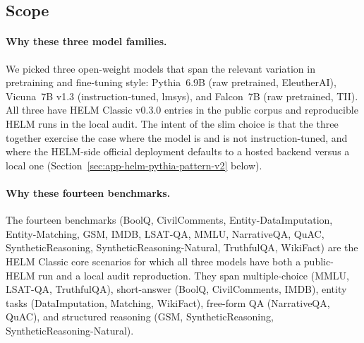 \subsection{Scope}
\label{sec:app-helm-scope-v2}

\paragraph{Why these three model families.}
We picked three open-weight models that span the relevant variation in
  pretraining and fine-tuning style: Pythia~6.9B (raw pretrained,
  EleutherAI), Vicuna~7B v1.3 (instruction-tuned, lmsys), and
  Falcon~7B (raw pretrained, TII).
All three have HELM Classic v0.3.0 entries in the public corpus and
  reproducible HELM runs in the local audit.
The intent of the slim choice is that the three together exercise the
  case where the model is and is not instruction-tuned, and where the
  HELM-side official deployment defaults to a hosted backend versus a
  local one (Section~\ref{sec:app-helm-pythia-pattern-v2} below).

\paragraph{Why these fourteen benchmarks.}
The fourteen benchmarks
  (BoolQ, CivilComments, Entity-DataImputation, Entity-Matching, GSM,
  IMDB, LSAT-QA, MMLU, NarrativeQA, QuAC, SyntheticReasoning,
  SyntheticReasoning-Natural, TruthfulQA, WikiFact)
  are the HELM Classic core scenarios for which all three models have
  both a public-HELM run and a local audit reproduction.
They span multiple-choice (MMLU, LSAT-QA, TruthfulQA), short-answer
  (BoolQ, CivilComments, IMDB), entity tasks (DataImputation, Matching,
  WikiFact), free-form QA (NarrativeQA, QuAC), and structured
  reasoning (GSM, SyntheticReasoning, SyntheticReasoning-Natural).

